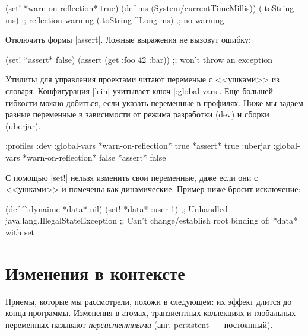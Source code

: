 \begin{english}
  \begin{clojure}
(set! *warn-on-reflection* true)
(def ms (System/currentTimeMillis))
(.toString ms)       ;; reflection warning
(.toString ^Long ms) ;; no warning
  \end{clojure}
\end{english}

Отключить формы \spverb|assert|. Ложные выражения не вызовут ошибку:

\begin{english}
  \begin{clojure}
(set! *assert* false)
(assert (get {:foo 42} :bar))
;; won't throw an exception
  \end{clojure}
\end{english}

Утилиты для управления проектами читают переменые с <<ушками>> из
словаря. Конфигурация \spverb|lein| учитывает ключ \spverb|:global-vars|. Еще
большей гибкости можно добиться, если указать переменные в профилях. Ниже мы
задаем разные переменные в зависимости от режима разработки (dev) и сборки
(uberjar).

\begin{english}
  \begin{clojure}
{:profiles
 :dev {:global-vars {*warn-on-reflection* true
                     *assert* true}}
 :uberjar {:global-vars {*warn-on-reflection* false
                         *assert* false}}}
  \end{clojure}
\end{english}

С помощью \spverb|set!| нельзя изменить свои переменные, даже если они с
<<ушками>> и помечены как динамические. Пример ниже бросит исключение:

\begin{english}
  \begin{clojure}
(def ^:dynaimc *data* nil)
(set! *data* {:user 1})
;; Unhandled java.lang.IllegalStateException
;; Can't change/establish root binding of: *data* with set
  \end{clojure}
\end{english}

\section{Изменения в контексте}

Приемы, которые мы рассмотрели, похожи в следующем: их эффект длится до конца
программы. Изменения в атомах, транзиентных коллекциях и глобальных переменных
называют \emph{персистентными} (анг. persistent~--- постоянный).

